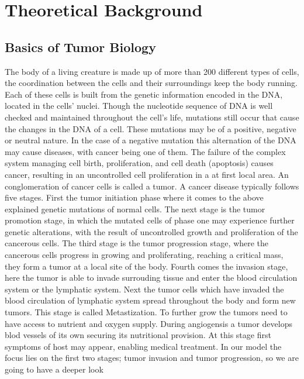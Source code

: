 \section{Theoretical Background}
\subsection{Basics of Tumor Biology}
The body of a living creature is made up of more than 200 different 
types of cells, the coordination between the cells and their 
surroundings keep the body running. Each of these cells is built from 
the genetic information encoded in the DNA, located in the 
cells' nuclei. Though the nucleotide sequence of DNA is well 
checked and maintained throughout the cell's life, mutations still
occur that cause the changes in the DNA of a cell. These mutations may 
be of a positive, negative or neutral nature. In the case of a negative 
mutation this alternation of the DNA may cause diseases, with cancer being one 
of them. The failure of the complex system managing cell birth, proliferation, 
and cell death (apoptosis) causes cancer, resulting in an uncontrolled cell proliferation in a at 
first local area. An conglomeration of cancer cells is called a tumor. \newline
A cancer disease typically follows five stages. First the tumor initiation phase where it comes to the above 
explained genetic mutations of normal cells. The next stage is the tumor promotion stage, in which 
the mutated cells of phase one may experience further genetic alterations, with the result of 
uncontrolled growth and proliferation of the cancerous cells. The third stage is the tumor 
progression stage, where the cancerous cells progress in growing and proliferating, reaching a critical mass, they form a tumor at a 
local site of the body. Fourth comes the invasion stage, here the tumor is able to invade surrouding tissue 
and enter the blood circulation system or the lymphatic system. Next the tumor cells which have invaded 
the blood circulation of lymphatic system spread throughout the body and form new tumors. This stage is called Metastization.
To further grow the tumors need to have access to nutrient and oxygen supply. During angiogensis a tumor develops 
blod vessels of its own securing its nutritional provision. At this stage first symptoms of host may appear, enabling medical 
treatment.\newline
In our model the focus lies on the first two stages; tumor invasion and tumor progression, so we are going to have a deeper look 

